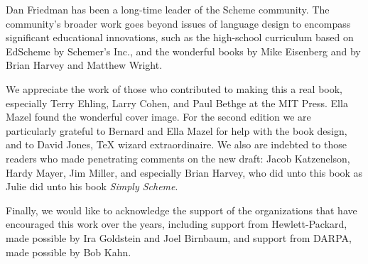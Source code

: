 Dan Friedman has been a long-time leader of the Scheme community.
The community's broader work goes beyond issues of language design to
encompass significant educational innovations, such as the high-school
curriculum based on EdScheme by Schemer's Inc., and the wonderful
books by Mike Eisenberg and by Brian Harvey and Matthew Wright.

We appreciate the work of those who contributed to making this a real
book, especially Terry Ehling, Larry Cohen, and Paul Bethge at the MIT
Press.  Ella Mazel found the wonderful cover image.  For the second
edition we are particularly grateful to Bernard and Ella Mazel for
help with the book design, and to David Jones, \TeX{} wizard
extraordinaire.  We also are indebted to those readers who made
penetrating comments on the new draft: Jacob Katzenelson, Hardy
Mayer, Jim Miller, and especially Brian Harvey, who did unto this book
as Julie did unto his book \textit{Simply Scheme}.

Finally, we would like to acknowledge the support of the organizations
that have encouraged this work over the years, including support from
Hewlett-Packard, made possible by Ira Goldstein and Joel Birnbaum, and
support from DARPA, made possible by Bob Kahn.
